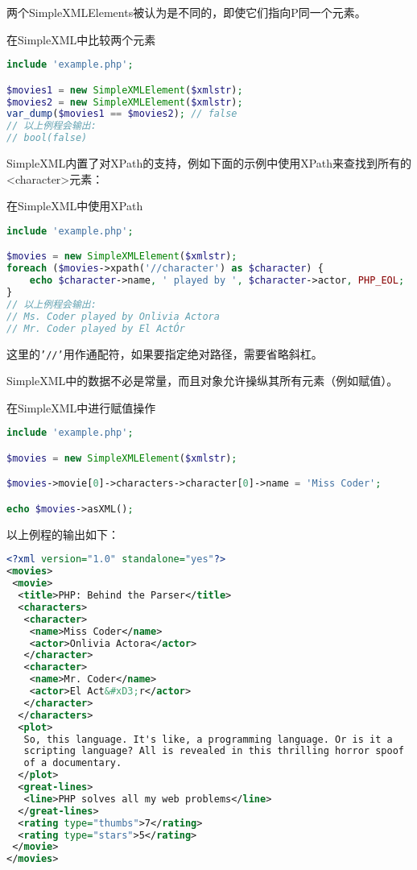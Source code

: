 两个SimpleXMLElements被认为是不同的，即使它们指向P同一个元素。

\begin{example}
在SimpleXML中比较两个元素
\begin{lstlisting}[language=PHP]
include 'example.php';

$movies1 = new SimpleXMLElement($xmlstr);
$movies2 = new SimpleXMLElement($xmlstr);
var_dump($movies1 == $movies2); // false
// 以上例程会输出:
// bool(false)
\end{lstlisting}
\end{example}

SimpleXML内置了对XPath的支持，例如下面的示例中使用XPath来查找到所有的<character>元素：

\begin{example}
在SimpleXML中使用XPath
\begin{lstlisting}[language=PHP]
include 'example.php';

$movies = new SimpleXMLElement($xmlstr);
foreach ($movies->xpath('//character') as $character) {
    echo $character->name, ' played by ', $character->actor, PHP_EOL;
}
// 以上例程会输出:
// Ms. Coder played by Onlivia Actora
// Mr. Coder played by El ActÓr
\end{lstlisting}
\end{example}

这里的\texttt{'//'}用作通配符，如果要指定绝对路径，需要省略斜杠。


SimpleXML中的数据不必是常量，而且对象允许操纵其所有元素（例如赋值）。

\begin{example}
在SimpleXML中进行赋值操作
\begin{lstlisting}[language=PHP]
include 'example.php';

$movies = new SimpleXMLElement($xmlstr);

$movies->movie[0]->characters->character[0]->name = 'Miss Coder';

echo $movies->asXML();
\end{lstlisting}
\end{example}

以上例程的输出如下：

\begin{lstlisting}[language=XML]
<?xml version="1.0" standalone="yes"?>
<movies>
 <movie>
  <title>PHP: Behind the Parser</title>
  <characters>
   <character>
    <name>Miss Coder</name>
    <actor>Onlivia Actora</actor>
   </character>
   <character>
    <name>Mr. Coder</name>
    <actor>El Act&#xD3;r</actor>
   </character>
  </characters>
  <plot>
   So, this language. It's like, a programming language. Or is it a
   scripting language? All is revealed in this thrilling horror spoof
   of a documentary.
  </plot>
  <great-lines>
   <line>PHP solves all my web problems</line>
  </great-lines>
  <rating type="thumbs">7</rating>
  <rating type="stars">5</rating>
 </movie>
</movies>
\end{lstlisting}

